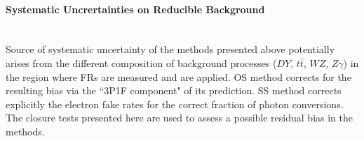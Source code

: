 %
\paragraph{Systematic Uncrertainties on Reducible Background} \\ \label{syst_reducible_bkg}
\newline
Source of systematic uncertainty of the methods presented above
potentially arises from the different composition of background processes
($DY$, $t \bar{t}$, $WZ$, $Z\gamma$) in the region where FRs are measured and are applied.
OS method corrects for the resulting bias via the ``3P1F component"
of its prediction. SS method corrects explicitly the electron fake rates
for the correct fraction of photon conversions. 
The closure tests presented here are used to assess a possible residual
bias in the methods.

